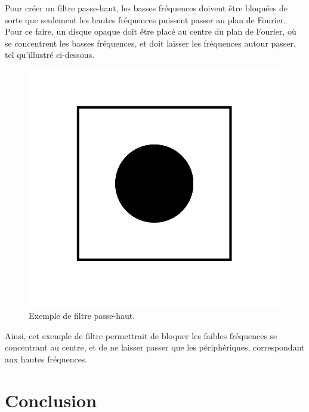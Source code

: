 \documentclass[11pt,letterpaper]{article}
\begin{document}
Pour créer un filtre passe-haut, les basses fréquences doivent être bloquées de sorte que seulement les hautes fréquences puissent passer au plan de Fourier. Pour ce faire, un disque opaque doit être placé au centre du plan de Fourier, où se concentrent les basses fréquences, et doit laisser les fréquences autour passer, tel qu'illustré ci-dessous.
\begin{figure}[H]
  \centering
  \includegraphics[scale=0.35]{filtrepassehaut.png}
  \caption{Exemple de filtre passe-haut.}
\end{figure}
Ainsi, cet exemple de filtre permettrait de bloquer les faibles fréquences se concentrant au centre, et de ne laisser passer que les périphériques, correspondant aux hautes fréquences.

\section{Conclusion}
\end{document}
